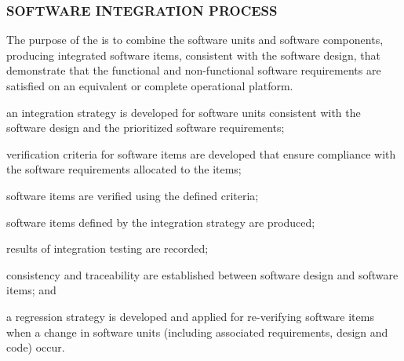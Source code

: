 		\newpage
		\subsubsection{SOFTWARE INTEGRATION PROCESS\label{proc:software_integration_process}}

			\begin{adjustwidth}{2em}{0pt} 

				The purpose of the  is to combine the software units and software components, producing integrated software items, consistent with the software design, that demonstrate that the functional and non-functional software requirements are satisfied on an equivalent or complete operational platform.

			\end{adjustwidth}

			\begin{adjustwidth}{2em}{0pt} 

				\begin{compactitem}

					\item an integration strategy is developed for software units consistent with the software design and the prioritized software requirements;

					\item verification criteria for software items are developed that ensure compliance with the software requirements allocated to the items;

					\item software items are verified using the defined criteria;

					\item software items defined by the integration strategy are produced;

					\item results of integration testing are recorded;

					\item consistency and traceability are established between software design and software items; and

					\item a regression strategy is developed and applied for re-verifying software items when a change in software units (including associated requirements, design and code) occur.

				\end{compactitem}

			\end{adjustwidth}

